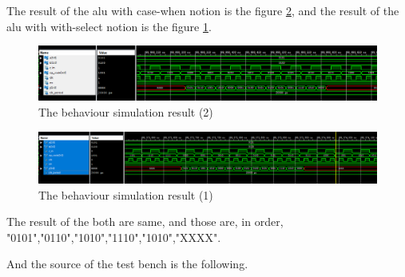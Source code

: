 \documentclass{article}
\begin{document}
    The result of the alu with case-when notion is the figure \ref{fig:homework6-2}, and the result
    of the alu with with-select notion is the figure \ref{fig:homework6-1}.

    \begin{figure}
      \centering
      \includegraphics[width=1\linewidth]{homework6-1}
      \caption{The behaviour simulation result (2)}
      \label{fig:homework6-1}
    \end{figure}

    \begin{figure}
      \centering
      \includegraphics[width=1\linewidth]{homework6-2}
      \caption{The behaviour simulation result (1)}
      \label{fig:homework6-2}
    \end{figure}

    The result of the both are same, and those are, in order, "0101","0110","1010","1110","1010","XXXX".

    And the source of the test bench is the following.
\end{document}
